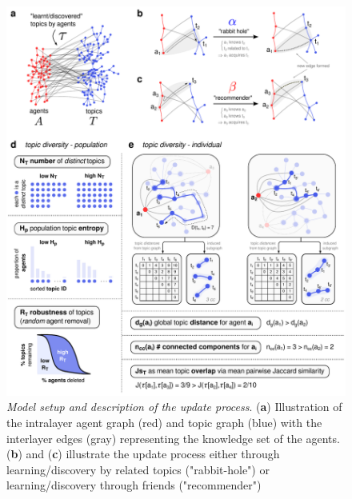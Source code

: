 \begin{figure}[!ht]
    \centering
    \includegraphics[width=\textwidth]{figures/Fig1.pdf}
    \caption{
    \textit{Model setup and description of the update process}.
    (\textbf{a}) Illustration of the intralayer agent graph (red) and topic graph (blue) with the interlayer edges (gray) representing the knowledge set of the agents.
    (\textbf{b}) and (\textbf{c}) illustrate the update process either through learning/discovery by related topics ("rabbit-hole") or learning/discovery through friends ("recommender")
    }
    \label{fig:1}
\end{figure}